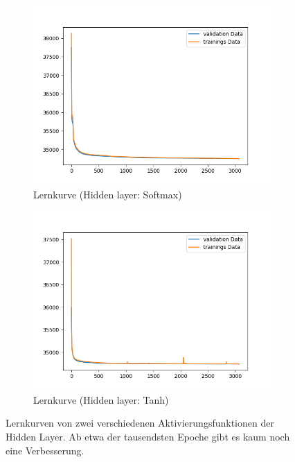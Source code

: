 \begin{figure}[ht]
\centering
\begin{subfigure}{0.5\textwidth}
\centering
\includegraphics[width=\linewidth]{pics/lernkurve_activationHidden-softmax_activationOutput-softmax}
\caption{Lernkurve (Hidden layer: Softmax)}
\label{fig:lernkurveSoftmax}
\end{subfigure}%
\begin{subfigure}{0.5\textwidth}
\centering
\includegraphics[width=\linewidth]{pics/lernkurve_activationHidden-tanh_activationOutput-softmax}
\caption{Lernkurve (Hidden layer: Tanh)}
\label{fig:lernkurveTanh}
\end{subfigure}%
\caption{Lernkurven von zwei verschiedenen Aktivierungsfunktionen der Hidden Layer. Ab etwa der tausendsten Epoche gibt es kaum noch eine Verbesserung.}
\label{fig:lernkurven}
\end{figure}



